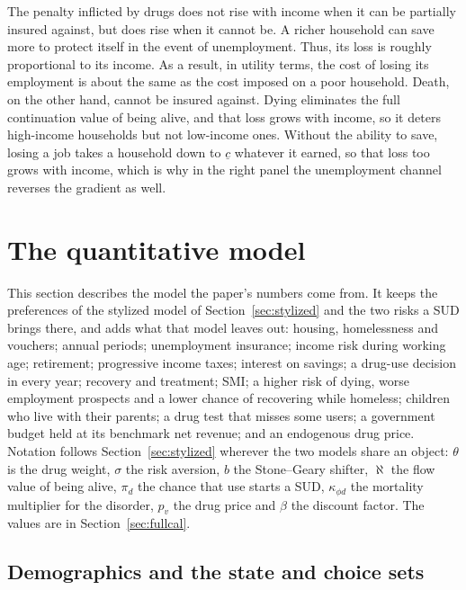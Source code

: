 \documentclass[10pt]{article}
\begin{document}
The penalty inflicted by drugs does not rise with income when it can be partially insured against, but does rise when it cannot be. A richer household can save more to protect itself in the event of unemployment. Thus, its loss is roughly proportional to its income. As a result, in utility terms, the cost of losing its employment is about the same as the cost imposed on a poor household. Death, on the other hand, cannot be insured against. Dying eliminates the full continuation value of being alive, and that loss grows with income, so it deters high-income households but not low-income ones. Without the ability to save, losing a job takes a household down to $\underline c$ whatever it earned, so that loss too grows with income, which is why in the right panel the unemployment channel reverses the gradient as well.

\section{The quantitative model}\label{sec:full}

This section
describes the model the paper's numbers come from. It keeps the preferences of the stylized
model of Section~\ref{sec:stylized} and the two risks a SUD brings there, and adds what that model leaves out: housing, homelessness and vouchers; annual periods; unemployment insurance; income risk during working age; retirement; progressive income taxes; interest on savings; a drug-use decision in every year; recovery and treatment; SMI; a higher risk of dying, worse employment prospects and a lower chance of recovering while homeless; children who live with their parents; a drug test that misses some users; a government budget held at its benchmark net revenue; and an endogenous drug price. Notation follows
Section~\ref{sec:stylized} wherever the two models share an object: $\theta$ is the drug weight, $\sigma$ the risk aversion, $b$ the  Stone--Geary shifter, $\aleph$ the flow value of being alive, $\pi_d$ the chance that use starts a SUD, $\kappa_{\phi d}$ the mortality multiplier for the disorder, $p_v$ the drug price and $\beta$ the discount factor. The values are in Section~\ref{sec:fullcal}.

\subsection{Demographics and the state and choice sets}
\end{document}
